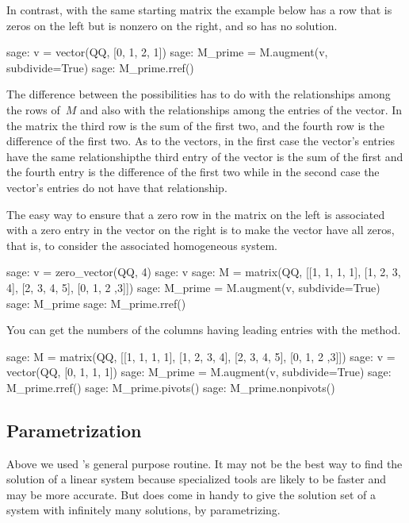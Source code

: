 In contrast, with the same starting matrix
the example below has a row that is zeros on the left but is nonzero
on the right, and so has no solution.
\begin{sagecommandline} 
sage: v = vector(QQ, [0, 1, 2, 1])             
sage: M_prime = M.augment(v, subdivide=True)
sage: M_prime.rref()                        
\end{sagecommandline}

The difference between the possibilities
has to do with the relationships among  
the rows of~$M$ and also with the relationships among the entries of the vector.
In the matrix
the third row is the sum of the first two, and the fourth
row is the difference of the first two.
As to the vectors, in the first case the vector's entries have the same 
relationship\Dash the third entry of the vector is the sum of the first 
and the fourth entry is the difference of the first two\Dash  
while in the second case the vector's entries do not have that relationship.

The easy way to ensure that a zero row in the matrix 
on the left is associated with a zero
entry in the vector on the right is to make the vector have all zeros, that is,
to consider the associated homogeneous system.
\begin{sagecommandline}
sage: v = zero_vector(QQ, 4)
sage: v
sage: M = matrix(QQ, [[1, 1, 1, 1], [1, 2, 3, 4], [2, 3, 4, 5], [0, 1, 2 ,3]]) 
sage: M_prime = M.augment(v, subdivide=True)
sage: M_prime
sage: M_prime.rref()
\end{sagecommandline}

You can get the numbers of the columns having leading entries with 
the  method.
\begin{sagecommandline}
sage: M = matrix(QQ, [[1, 1, 1, 1], [1, 2, 3, 4], [2, 3, 4, 5], [0, 1, 2 ,3]]) 
sage: v = vector(QQ, [0, 1, 1, 1])
sage: M_prime = M.augment(v, subdivide=True)
sage: M_prime.rref()
sage: M_prime.pivots()         
sage: M_prime.nonpivots()         
\end{sagecommandline}





\subsection{Parametrization}
Above we used \Sage's general purpose  routine.
It may not be the best way to find the solution
of a linear system because specialized tools are likely to be faster and
may be more accurate. 
But  does come in handy to give the solution set of a system
with infinitely many solutions, by parametrizing.

